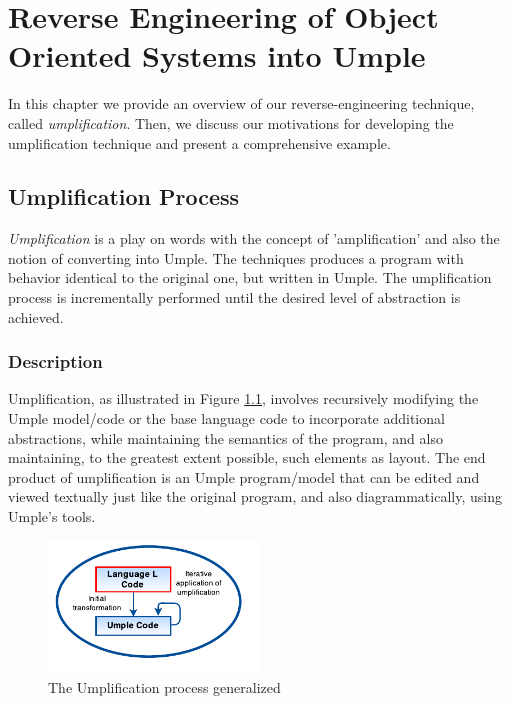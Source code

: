 \lhead{\emph{\leftmark}}  %
\chapter{Reverse Engineering of Object Oriented Systems into Umple}
\label{chap:core}

In this chapter we provide an overview of our reverse-engineering technique, called \textit{umplification}. Then, we discuss our motivations for developing the umplification technique and present a comprehensive example. 

\section{Umplification Process}

\textit{Umplification} is a play on words with the concept of 'amplification' and also the notion of converting into Umple. The techniques produces a program with behavior identical to the original one, but written in Umple. The umplification process is incrementally performed until the desired level of abstraction is achieved. 

\subsection{Description}
Umplification, as illustrated in Figure \ref{fig:umplificationLoop}, involves recursively modifying the Umple model/code or the base language code to incorporate additional abstractions, while maintaining the semantics of the program, and also maintaining, to the greatest extent possible, such elements as layout. The end product of umplification is an Umple program/model that can be edited and viewed textually just like the original program, and also diagrammatically, using Umple's tools. 

\begin{figure}[h]
\centering
\includegraphics[width=0.50\textwidth]{Figures/UmplificationProcess.pdf}
\caption{The Umplification process generalized}
\label{fig:umplificationLoop}
\end{figure}


